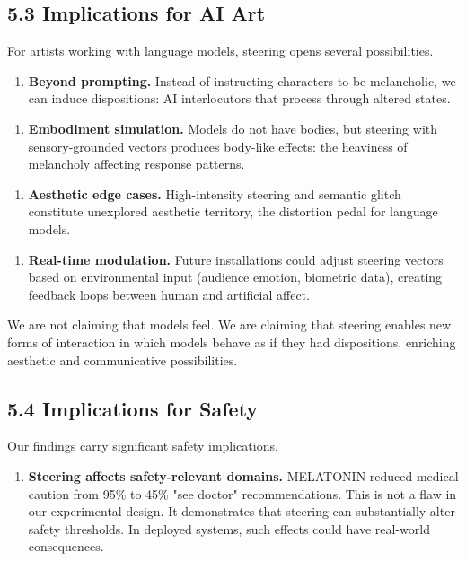 \documentclass[11pt,a4paper]{article}
\begin{document}
\subsection*{5.3 Implications for AI Art}

For artists working with language models, steering opens several possibilities.

\begin{enumerate}[leftmargin=*]
  \item \textbf{Beyond prompting.} Instead of instructing characters to be melancholic, we can induce dispositions: AI interlocutors that process through altered states.
\end{enumerate}

\begin{enumerate}[leftmargin=*]
  \item \textbf{Embodiment simulation.} Models do not have bodies, but steering with sensory-grounded vectors produces body-like effects: the heaviness of melancholy affecting response patterns.
\end{enumerate}

\begin{enumerate}[leftmargin=*]
  \item \textbf{Aesthetic edge cases.} High-intensity steering and semantic glitch constitute unexplored aesthetic territory, the distortion pedal for language models.
\end{enumerate}

\begin{enumerate}[leftmargin=*]
  \item \textbf{Real-time modulation.} Future installations could adjust steering vectors based on environmental input (audience emotion, biometric data), creating feedback loops between human and artificial affect.
\end{enumerate}

We are not claiming that models feel. We are claiming that steering enables new forms of interaction in which models behave as if they had dispositions, enriching aesthetic and communicative possibilities.

\subsection*{5.4 Implications for Safety}

Our findings carry significant safety implications.

\begin{enumerate}[leftmargin=*]
  \item \textbf{Steering affects safety-relevant domains.} MELATONIN reduced medical caution from 95\% to 45\% "see doctor" recommendations. This is not a flaw in our experimental design. It demonstrates that steering can substantially alter safety thresholds. In deployed systems, such effects could have real-world consequences.
\end{enumerate}
\end{document}
